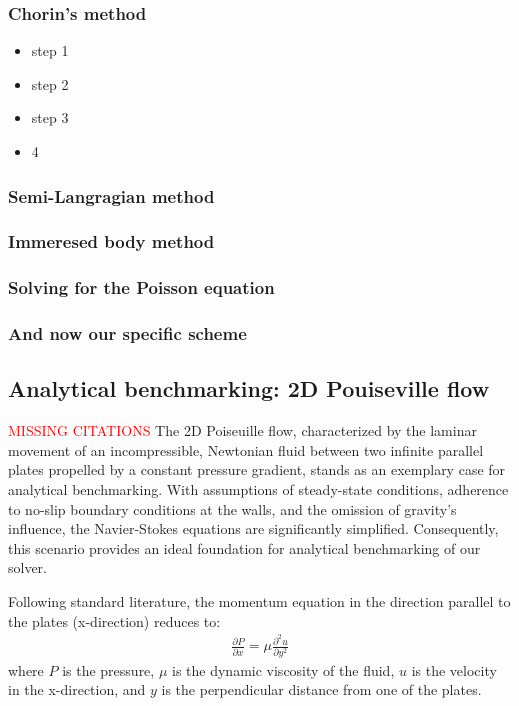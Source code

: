 \subsubsection{Chorin's method}
\begin{itemize}
    \item step 1
    \item step 2
    \item step 3
    \item 4
\end{itemize}
\subsubsection{Semi-Langragian method}
\subsubsection{Immeresed body method}
\subsubsection{Solving for the Poisson equation}
\subsubsection{And now our specific scheme}


\subsection{Analytical benchmarking: 2D Pouiseville flow}
\textcolor{red}{MISSING CITATIONS}
The 2D Poiseuille flow, characterized by the laminar movement of an incompressible, Newtonian fluid between two infinite parallel plates propelled by a constant pressure gradient, stands as an exemplary case for analytical benchmarking. With assumptions of steady-state conditions, adherence to no-slip boundary conditions at the walls, and the omission of gravity's influence, the Navier-Stokes equations are significantly simplified. Consequently, this scenario provides an ideal foundation for analytical benchmarking of our solver.

Following standard literature, the momentum equation in the direction parallel to the plates (x-direction) reduces to:
\begin{align}
    \frac{\partial P}{\partial x} = \mu \frac{\partial^2 u}{\partial y^2}
\end{align}
where $P$ is the pressure, $\mu$ is the dynamic viscosity of the fluid, $u$ is the velocity in the x-direction, and $y$ is the perpendicular distance from one of the plates.

